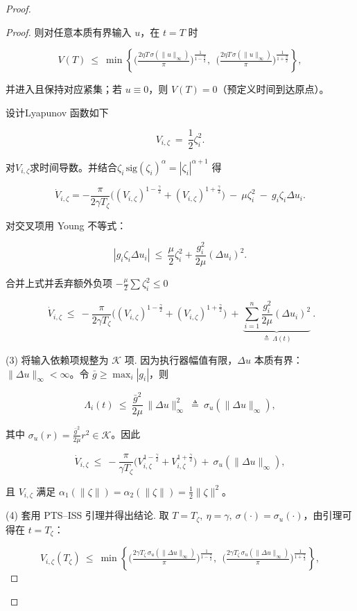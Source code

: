 \documentclass[pdflatex,sn-mathphys-num]{sn-jnl}%
\theoremstyle{thmstyleone}%
\theoremstyle{thmstyletwo}%
\theoremstyle{thmstylethree}%
\begin{document}
\begin{proof}
\begin{proof}
	则对任意本质有界输入 $u$，在 $t=T$ 时
	
	$$
	V(T)\ \le\ \min\!\left\{
	\Big(\tfrac{2\eta T\,\sigma(\|u\|_\infty)}{\pi}\Big)^{\!\frac{1}{1-\frac{\eta}{2}}},
	\ \ 
	\Big(\tfrac{2\eta T\,\sigma(\|u\|_\infty)}{\pi}\Big)^{\!\frac{1}{1+\frac{\eta}{2}}}
	\right\},
	$$
	
	并进入且保持对应紧集；若 $u\equiv0$，则 $V(T)=0$（预定义时间到达原点）。
	
	设计Lyapunov 函数如下
	
	$$
	V_{i,\zeta}\ =\ \frac12\zeta_i^2.
	$$
	
	对$V_{i,\zeta}$求时间导数。并结合$\zeta_i\,\mathrm{sig}(\zeta_i)^\alpha=|\zeta_i|^{\alpha+1}$ 得
	
	$$
	\dot V_{i,\zeta}= -\frac{\pi}{2\gamma T_\zeta}\Big((V_{i,\zeta})^{1-\frac{\gamma}{2}}+(V_{i,\zeta})^{1+\frac{\gamma}{2}}\Big)\ -\ \mu\zeta_i^2\ -\  g_i\zeta_i\Delta u_i.
	$$
	
	
	
	对交叉项用 Young 不等式：
	
	$$
	|g_i\zeta_i\Delta u_i|\ \le\ \frac{\mu}{2}\zeta_i^2+\frac{g_i^2}{2\mu}(\Delta u_i)^2 .
	$$
	
	合并上式并丢弃额外负项 $-\frac{\mu}{2}\sum\zeta_i^2\le0$
	
	$$
	\boxed{\;
	\dot V_{i,\zeta}
	\ \le\
	-\frac{\pi}{2\gamma T_\zeta}\Big((V_{i,\zeta})^{1-\frac{\gamma}{2}}+(V_{i,\zeta})^{1+\frac{\gamma}{2}}\Big)
	\ +\ \underbrace{\sum_{i=1}^{n}\frac{g_i^2}{2\mu}(\Delta u_i)^2}_{\displaystyle \triangleq\ \Lambda(t)}\ .
	}
	$$
	
	(3) 将输入依赖项规整为 $\mathcal K$ 项.
	因为执行器幅值有限，$\Delta u$ 本质有界：$\|\Delta u\|_\infty<\infty$。令 $\bar g\ge \max_i|g_i|$，则
	
	$$
	\Lambda_i(t)\ \le\ \frac{\bar g^2}{2\mu}\,\|\Delta u\|_\infty^2\ \triangleq\ \sigma_u(\|\Delta u\|_\infty),
	$$
	
	其中 $\sigma_u(r)=\frac{\bar g^2}{2\mu} r^2\in\mathcal K$。因此
	
	$$
	\dot V_{i,\zeta}
	\ \le\
	-\frac{\pi}{\gamma T_\zeta}\Big(V_{i,\zeta}^{1-\frac{\gamma}{2}}+V_{i,\zeta}^{1+\frac{\gamma}{2}}\Big)
	\ +\ \sigma_u(\|\Delta u\|_\infty),
	$$
	
	且 $V_{i,\zeta}$ 满足 $\alpha_1(\|\zeta\|)=\alpha_2(\|\zeta\|)=\tfrac12\|\zeta\|^2$。
	
	(4) 套用 PTS–ISS 引理并得出结论.
	取 $T=T_\zeta,\ \eta=\gamma,\ \sigma(\cdot)=\sigma_u(\cdot)$，由引理可得在 $t=T_\zeta$：
	
	$$
	V_{i,\zeta}(T_\zeta)\ \le\
	\min\!\left\{
	\Big(\tfrac{2\gamma T_\zeta\,\sigma_u(\|\Delta u\|_\infty)}{\pi}\Big)^{\!\frac{1}{1-\frac{\gamma}{2}}},
	\ \ 
	\Big(\tfrac{2\gamma T_\zeta\,\sigma_u(\|\Delta u\|_\infty)}{\pi}\Big)^{\!\frac{1}{1+\frac{\gamma}{2}}}
	\right\},
	$$
	

\end{proof}
\end{proof}
\end{document}
